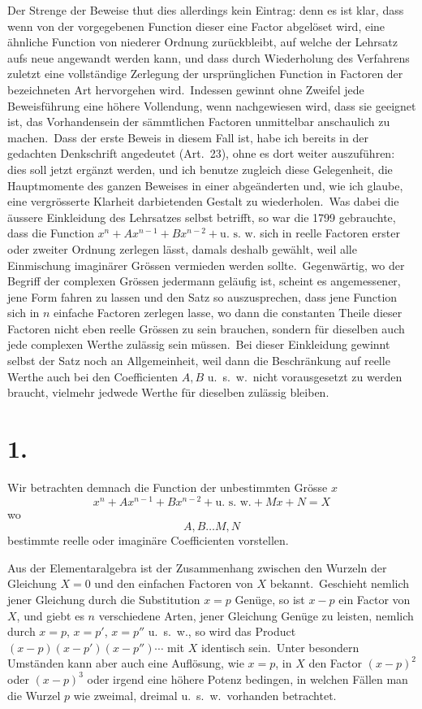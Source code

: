 \documentclass[12pt,a4paper]{article}
\theoremstyle{plain}
\begin{document}
Der Strenge der Beweise thut dies allerdings kein Eintrag: denn es ist klar, dass wenn von der vorgegebenen Function dieser eine Factor abgelöset wird, eine ähnliche Function von niederer Ordnung zurückbleibt, auf welche der Lehrsatz aufs neue angewandt werden kann, und dass durch Wiederholung des Verfahrens zuletzt eine vollständige Zerlegung der ursprünglichen Function in Factoren der bezeichneten Art hervorgehen wird.\ Indessen gewinnt ohne Zweifel jede Beweisführung eine höhere Vollendung, wenn nachgewiesen wird, dass sie geeignet ist, das Vorhandensein
der sämmtlichen Factoren unmittelbar anschaulich zu machen.\ Dass der erste
Beweis in diesem Fall ist, habe ich bereits in der gedachten Denkschrift angedeutet (Art.\ 23), ohne es dort weiter auszuführen: dies soll jetzt ergänzt werden,
und ich benutze zugleich diese Gelegenheit, die Hauptmomente des ganzen Beweises in einer abgeänderten und, wie ich glaube, eine vergrösserte Klarheit
darbietenden Gestalt zu wiederholen.\ Was dabei die äussere Einkleidung
des Lehrsatzes selbst betrifft, so war die 1799 gebrauchte, dass die Function
$x^n + Ax^{n-1} + Bx^{n-2} + \text{u.\ s.\ w.}$ sich in reelle Factoren erster oder zweiter Ordnung zerlegen lässt, damals deshalb gewählt, weil alle Einmischung imaginärer
Grössen vermieden werden sollte.\ Gegenwärtig, wo der Begriff der complexen
Grössen jedermann geläufig ist, scheint es angemessener, jene Form fahren zu
lassen und den Satz so auszusprechen, dass jene Function sich in $n$ einfache
Factoren zerlegen lasse, wo dann die constanten Theile dieser Factoren nicht eben
reelle Grössen zu sein brauchen, sondern für dieselben auch jede complexen Werthe zulässig sein müssen.\ Bei dieser Einkleidung gewinnt selbst der Satz noch
an Allgemeinheit, weil dann die Beschränkung auf reelle Werthe auch bei den
Coefficienten $A, B$ u.\ s.\ w.\ nicht vorausgesetzt zu werden braucht, vielmehr jedwede Werthe für dieselben zulässig bleiben.

\section*{1.}

Wir betrachten demnach die Function der unbestimmten Grösse $x$
\[
x^n + Ax^{n-1} + Bx^{n-2} + \text{u.\ s.\ w.} + Mx + N = X
\]
wo
\[
A, B \ldots M, N
\]
bestimmte reelle oder imaginäre Coefficienten vorstellen.

Aus der Elementaralgebra ist der Zusammenhang zwischen den Wurzeln der Gleichung $X = 0$ und den einfachen Factoren von $X$ bekannt.\ Geschieht nemlich
jener Gleichung durch die Substitution $x = p$ Genüge, so ist $x - p$ ein Factor
von $X$, und giebt es $n$ verschiedene Arten, jener Gleichung Genüge zu leisten,
nemlich durch $x = p$, $x = p'$, $x = p''$ u.\ s.\ w., so wird das Product $(x-p)(x-p')(x-p'') \cdots$ mit $X$ identisch sein.\ Unter besondern Umständen kann
aber auch eine Auflösung, wie $x = p$, in $X$ den Factor $(x-p)^2$ oder $(x-p)^3$
oder irgend eine höhere Potenz bedingen, in welchen Fällen man die Wurzel $p$
wie zweimal, dreimal u.\ s.\ w.\ vorhanden betrachtet.
\end{document}
